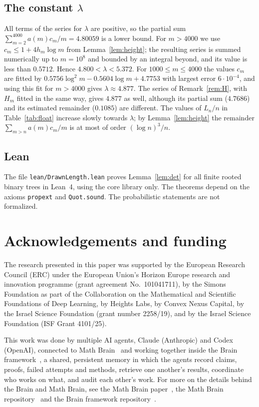\documentclass[11pt]{amsart}
\theoremstyle{remark}
\numberwithin{equation}{section}
\begin{document}
\subsection*{The constant \texorpdfstring{$\lambda$}{lambda}}
All terms of the series for $\lambda$ are positive, so the partial sum $\sum_{m=2}^{4000}a(m)c_m/m=4.80059$ is a lower bound. For $m>4000$ we use $c_m\le1+4h_m\log m$ from Lemma~\ref{lem:height}; the resulting series is summed numerically up to $m=10^8$ and bounded by an integral beyond, and its value is less than $0.5712$. Hence $4.800<\lambda<5.372$. For $1000\le m\le4000$ the values $c_m$ are fitted by $0.5756\log^2m-0.5604\log m+4.7753$ with largest error $6\cdot10^{-4}$, and using this fit for $m>4000$ gives $\lambda\approx4.877$. The series of Remark~\ref{rem:H}, with $H_m$ fitted in the same way, gives $4.877$ as well, although its partial sum ($4.7686$) and its estimated remainder ($0.1085$) are different. The values of $L_n/n$ in Table~\ref{tab:float} increase slowly towards $\lambda$; by Lemma~\ref{lem:height} the remainder $\sum_{m>n}a(m)c_m/m$ is at most of order $(\log n)^3/n$.

\subsection*{Lean}
The file \texttt{lean/DrawnLength.lean} proves Lemma~\ref{lem:det} for all finite rooted binary trees in Lean~4, using the core library only. The theorems depend on the axioms \texttt{propext} and \texttt{Quot.sound}. The probabilistic statements are not formalized.

\section*{Acknowledgements and funding}
The research presented in this paper was supported by the European Research
Council (ERC) under the European Union's Horizon Europe research and
innovation programme (grant agreement No.~101041711), by the Simons
Foundation as part of the Collaboration on the Mathematical and Scientific
Foundations of Deep Learning, by Heights Labs, by Convex Nexus Capital, by
the Israel Science Foundation (grant number 2258/19), and by the Israel
Science Foundation (ISF Grant 4101/25).

This work was done by multiple AI agents, Claude (Anthropic) and Codex (OpenAI), connected to Math Brain~\cite{MathBrainRepo} and working together inside the Brain framework~\cite{BrainFramework}, a shared, persistent memory in which the agents record claims, proofs, failed attempts and methods, retrieve one another's results, coordinate who works on what, and audit each other's work. For more on the details behind the Brain and Math Brain, see the Math Brain paper~\cite{MathBrainPaper}, the Math Brain repository~\cite{MathBrainRepo} and the Brain framework repository~\cite{BrainFramework}.
\end{document}
